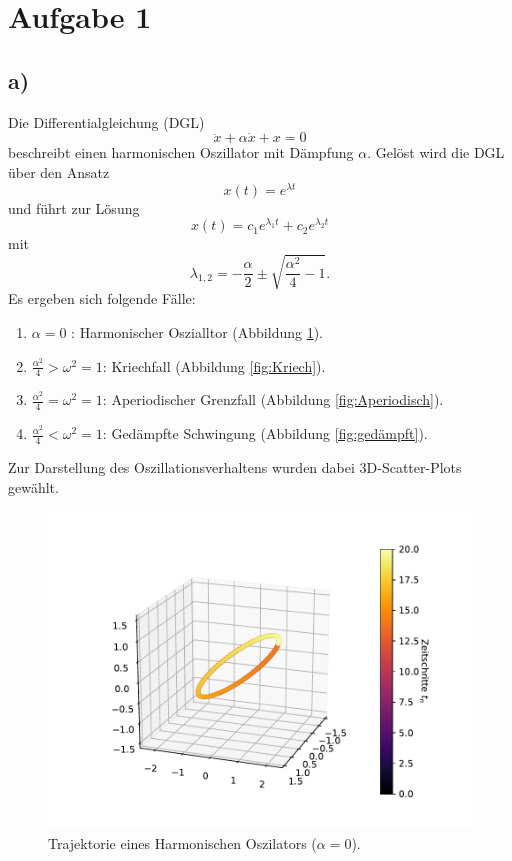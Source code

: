 \section*{Aufgabe 1}
\subsection*{a)}
Die Differentialgleichung (DGL) 
\begin{equation}
    \ddot{x} + \alpha \dot{x} + x = 0
\end{equation}
beschreibt einen harmonischen Oszillator mit Dämpfung $\alpha$.
Gelöst wird die DGL über den Ansatz 
\begin{equation}
    x(t) = e^{\lambda t}
\end{equation}
und führt zur Lösung 
\begin{equation}
    x(t) = c_1 e^{\lambda_1 t} + c_2 e^{\lambda_2 t}
\end{equation}
mit 
\begin{equation}
    \lambda_{1,2} = - \frac{\alpha}{2} \pm \sqrt{ \frac{\alpha^2}{4} -1 }.
\end{equation}
Es ergeben sich folgende Fälle:
\begin{enumerate}
    \item $\alpha = 0$ : Harmonischer Oszialltor (Abbildung \ref{fig:harmonisch}).
    \item $\frac{\alpha^2}{4} > \omega^2 = 1$: Kriechfall (Abbildung \ref{fig:Kriech}).
    \item $\frac{\alpha^2}{4} = \omega^2 = 1$: Aperiodischer Grenzfall (Abbildung \ref{fig:Aperiodisch}).
    \item $\frac{\alpha^2}{4} < \omega^2 = 1$: Gedämpfte Schwingung (Abbildung \ref{fig:gedämpft}).
\end{enumerate}
Zur Darstellung des Oszillationsverhaltens wurden dabei 3D-Scatter-Plots gewählt.
\begin{figure}
  \centering
  \includegraphics[scale=0.7]{A2/plots/aufg2_a1.pdf}
  \caption{Trajektorie eines Harmonischen Oszilators ($\alpha = 0$).}
  \label{fig:harmonisch}
\end{figure}

